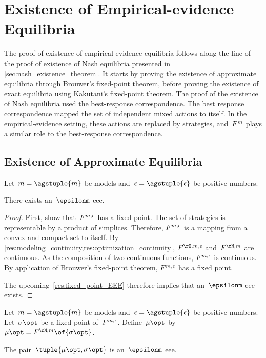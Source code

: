 \section{Existence of Empirical-evidence Equilibria}

The proof of existence of empirical-evidence equilibria follows along the line of the proof of existence of Nash equilibria presented in \cref{sec:nash_existence_theorem}.
It starts by proving the existence of approximate equilibria through Brouwer's fixed-point theorem, before proving the existence of exact equilibria using Kakutani's fixed-point theorem.
The proof of the existence of Nash equilibria used the best-response correspondence.
The best response correspondence mapped the set of independent mixed actions to itself.
In the empirical-evidence setting, these actions are replaced by strategies, and~\(F^{m}\) plays a similar role to the best-response correspondence.

\subsection{Existence of Approximate Equilibria}

\begin{theorem}
\label{res:mme_existence}
Let~\(m = \agstuple{m}\) be models and~\(\epsilon =\agstuple{\epsilon} \) be positive numbers.

There exists an~\(\epsilonm\) \ac{eee}.
\end{theorem}

\begin{proof}
First, show that~\(F^{m, \epsilon}\) has a fixed point.
The set of strategies is representable by a product of simplices.
Therefore, \(F^{m, \epsilon}\) is a mapping from a convex and compact set to itself.
By \cref{res:modeling_continuity,res:optimization_continuity}, \(\FOe\) and~\(\FM\) are continuous.
As the composition of two continuous functions, \(F^{m, \epsilon}\) is continuous.
By application of Brouwer's fixed-point theorem, \(F^{m, \epsilon}\) has a fixed point.

The upcoming~\cref{res:fixed_point_EEE} therefore implies that an~\(\epsilonm\) \ac{eee} exists.
\end{proof}

\begin{proposition}
\label{res:fixed_point_EEE}
Let~\(m = \agstuple{m}\) be models and~\(\epsilon =\agstuple{\epsilon} \) be positive numbers.
Let~\(\sigma\opt\) be a fixed point of~\(F^{m, \epsilon}\).
Define~\(\mu\opt\) by~\(\mu\opt = \FM \of{\sigma\opt}\).

The pair~\(\tuple{\mu\opt, \sigma\opt}\) is an~\(\epsilonm\) \ac{eee}.
\end{proposition}

